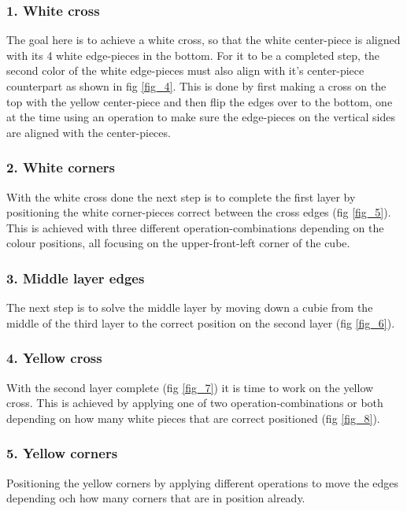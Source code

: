 \documentclass[a4paper,11pt]{kth-mag}
\begin{document}
\subsubsection{1. White cross}
The goal here is to achieve a white cross, so that the white center-piece is aligned with its 4 white edge-pieces in the bottom. For it to be a completed step, the second color of the white edge-pieces must also align with it’s center-piece counterpart as shown in fig \ref{fig_4}. This is done by first making a cross on the top with the yellow center-piece and then flip the edges over to the bottom, one at the time using an operation to make sure the edge-pieces on the vertical sides are aligned with the center-pieces.
\subsubsection{2. White corners}
With the white cross done the next step is to complete the first layer by positioning the white corner-pieces correct between the cross edges (fig \ref{fig_5}). This is achieved with three different operation-combinations depending on the colour positions, all focusing on the upper-front-left corner of the cube.
\subsubsection{3. Middle layer edges}
The next step is to solve the middle layer by moving down a cubie from the middle of the third layer to the correct position on the second layer (fig \ref{fig_6}). 
\subsubsection{4. Yellow cross}
With the second layer complete (fig \ref{fig_7}) it is time to work on the yellow cross. This is achieved by applying one of two operation-combinations or both depending on how many white pieces that are correct positioned (fig \ref{fig_8}).  
\subsubsection{5. Yellow corners}
Positioning the yellow corners by applying different operations to move the edges depending och how many corners that are in position already. 
\end{document}
